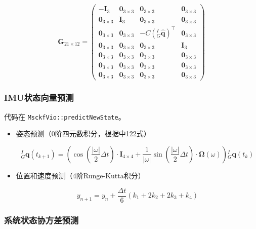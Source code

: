 \documentclass[12pt,a4paper]{article}
\begin{document}
\begin{equation*}
\mathbf{G}_{21 \times 12} = 
\begin{pmatrix}
-\mathbf{I}_3 & \mathbf{0}_{3\times 3} & \mathbf{0}_{3\times 3} & \mathbf{0}_{3\times 3} \\
\mathbf{0}_{3\times 3} & \mathbf{I}_3 &  \mathbf{0}_{3\times 3} & \mathbf{0}_{3\times 3} \\
\mathbf{0}_{3\times 3} & \mathbf{0}_{3\times 3} & -C\left({}^I_G\hat{\mathbf{q}}\right)^\top & \mathbf{0}_{3\times 3} \\
\mathbf{0}_{3\times 3} & \mathbf{0}_{3\times 3} & \mathbf{0}_{3\times 3} & \mathbf{I}_3 \\
\mathbf{0}_{3\times 3} & \mathbf{0}_{3\times 3} & \mathbf{0}_{3\times 3} & \mathbf{0}_{3\times 3} \\
\mathbf{0}_{3\times 3} & \mathbf{0}_{3\times 3} & \mathbf{0}_{3\times 3} & \mathbf{0}_{3\times 3} \\
\mathbf{0}_{3\times 3} & \mathbf{0}_{3\times 3} & \mathbf{0}_{3\times 3} & \mathbf{0}_{3\times 3}
\end{pmatrix}
\end{equation*}


\subsubsection{IMU状态向量预测}

代码在 \verb|MsckfVio::predictNewState|。

\begin{itemize}
\item 姿态预测（0阶四元数积分，根据\cite{trawny2005indirect}中122式）

\begin{equation}
{}^I_G \mathbf{q}(t_{k+1}) =
\left(
\cos \left(\frac{|\omega|}{2} \Delta t\right) \cdot \mathbf{I}_{4 \times 4}+\frac{1}{|\omega|} \sin \left(\frac{|\omega|}{2} \Delta t\right) \cdot \mathbf{\Omega}(\omega)
\right)
{}^I_G \mathbf{q}(t_k) 
\end{equation}

\item 位置和速度预测（4阶Runge-Kutta积分）

\begin{equation}
y_{n+1} = y_n + \frac{\Delta t}{6} (k_1 + 2k_2 + 2k_3 + k_4)
\end{equation}

\end{itemize}

\subsubsection{系统状态协方差预测}
\end{document}
